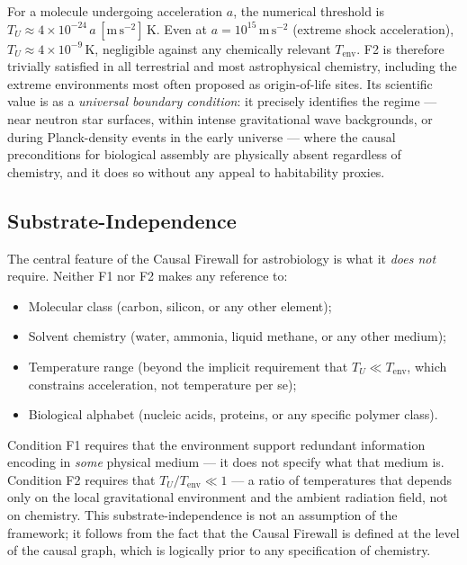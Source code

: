 \documentclass[11pt,a4paper]{article}
\theoremstyle{plain}
\theoremstyle{definition}
\theoremstyle{remark}
\begin{document}
\begin{description}
  For a molecule undergoing acceleration $a$, the numerical threshold is
  $T_U \approx 4\times10^{-24}\,a\,[\mathrm{m\,s}^{-2}]\,\mathrm{K}$.
  Even at $a = 10^{15}\,\mathrm{m\,s}^{-2}$ (extreme shock acceleration),
  $T_U \approx 4\times10^{-9}\,\mathrm{K}$, negligible against any chemically
  relevant $T_{\mathrm{env}}$.  F2 is therefore trivially satisfied in all
  terrestrial and most astrophysical chemistry, including the extreme environments
  most often proposed as origin-of-life sites.  Its scientific value is as a
  \emph{universal boundary condition}: it precisely identifies the regime --- near
  neutron star surfaces, within intense gravitational wave backgrounds, or during
  Planck-density events in the early universe --- where the causal preconditions
  for biological assembly are physically absent regardless of chemistry, and it
  does so without any appeal to habitability proxies.
\end{description}

\subsection{Substrate-Independence}

The central feature of the Causal Firewall for astrobiology is what it
\emph{does not} require. Neither F1 nor F2 makes any reference to:
\begin{itemize}[noitemsep]
  \item Molecular class (carbon, silicon, or any other element);
  \item Solvent chemistry (water, ammonia, liquid methane, or any other medium);
  \item Temperature range (beyond the implicit requirement that $T_U \ll T_{\mathrm{env}}$,
    which constrains acceleration, not temperature per se);
  \item Biological alphabet (nucleic acids, proteins, or any specific polymer class).
\end{itemize}
Condition F1 requires that the environment support redundant information
encoding in \emph{some} physical medium --- it does not specify what that
medium is. Condition F2 requires that $T_U/T_{\mathrm{env}} \ll 1$ --- a
ratio of temperatures that depends only on the local gravitational environment
and the ambient radiation field, not on chemistry. This substrate-independence
is not an assumption of the framework; it follows from the fact that the
Causal Firewall is defined at the level of the causal graph, which is logically
prior to any specification of chemistry.
\end{document}
